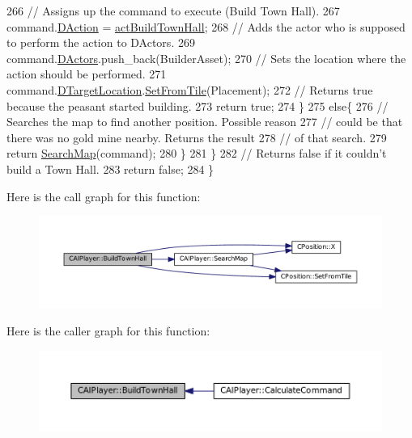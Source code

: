 \begin{DoxyCode}
266             \textcolor{comment}{// Assigns up the command to execute (Build Town Hall).}
267             command.\hyperlink{structSPlayerCommandRequest_a80897bbccf2c4e0b148a7aa815a926c6}{DAction} = \hyperlink{GameDataTypes_8h_a35b98ce26aca678b03c6f9f76e4778cea0b5f001e8c77b8a87998da6320595498}{actBuildTownHall};
268             \textcolor{comment}{// Adds the actor who is supposed to perform the action to DActors.}
269             command.\hyperlink{structSPlayerCommandRequest_aa37fc01519676345703d78b9f573894a}{DActors}.push\_back(BuilderAsset);
270             \textcolor{comment}{// Sets the location where the action should be performed.}
271             command.\hyperlink{structSPlayerCommandRequest_a701702b94ca2fd2738e95ef6711dd41a}{DTargetLocation}.\hyperlink{classCPosition_a46994e6a8b8e3b4237edd7259ad844b6}{SetFromTile}(Placement);
272             \textcolor{comment}{// Returns true because the peasant started building.}
273             \textcolor{keywordflow}{return} \textcolor{keyword}{true};
274         \}
275         \textcolor{keywordflow}{else}\{
276             \textcolor{comment}{// Searches the map to find another position. Possible reason}
277             \textcolor{comment}{// could be that there was no gold mine nearby. Returns the result}
278             \textcolor{comment}{// of that search.}
279             \textcolor{keywordflow}{return} \hyperlink{classCAIPlayer_afafbe8fc589e09a16ae1f02f2794d7b0}{SearchMap}(command);  
280         \}
281     \}
282     \textcolor{comment}{// Returns false if it couldn't build a Town Hall.}
283     \textcolor{keywordflow}{return} \textcolor{keyword}{false};
284 \}
\end{DoxyCode}
Here is the call graph for this function\+:\nopagebreak
\begin{figure}[H]
\begin{center}
\leavevmode
\includegraphics[width=350pt]{classCAIPlayer_a41cdefbe14210fb70b793a32778c5141_cgraph}
\end{center}
\end{figure}
Here is the caller graph for this function\+:\nopagebreak
\begin{figure}[H]
\begin{center}
\leavevmode
\includegraphics[width=350pt]{classCAIPlayer_a41cdefbe14210fb70b793a32778c5141_icgraph}
\end{center}
\end{figure}
